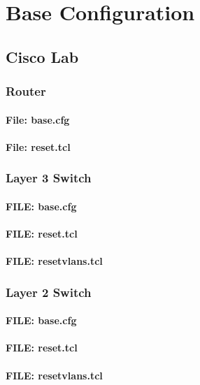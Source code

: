 \chapter{Base Configuration}

\section{Cisco Lab}


\subsection{Router}
\subsubsection{File: base.cfg}
%
\subsubsection{File: reset.tcl}
%

\newpage


\subsection{Layer 3 Switch}
\subsubsection{FILE: base.cfg}

\subsubsection{FILE: reset.tcl}

\subsubsection{FILE: resetvlans.tcl}


\newpage


\subsection{Layer 2 Switch}
\subsubsection{FILE: base.cfg}

\subsubsection{FILE: reset.tcl}

\subsubsection{FILE: resetvlans.tcl}

